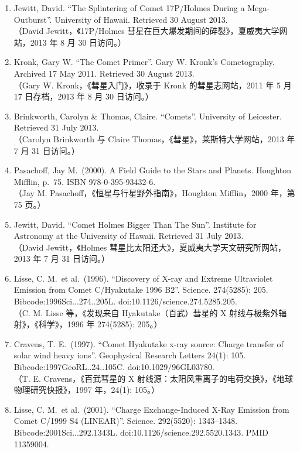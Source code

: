 \begin{enumerate}
（Rosine Lallement 等，《海尔–波普彗星在莱曼α线中的阴影》，《地球、月球与行星》，2002 年，90(1): 67–76。）
\item Jewitt, David. “The Splintering of Comet 17P/Holmes During a Mega-Outburst”. University of Hawaii. Retrieved 30 August 2013.\\
（David Jewitt，《17P/Holmes 彗星在巨大爆发期间的碎裂》，夏威夷大学网站，2013 年 8 月 30 日访问。）
\item Kronk, Gary W. “The Comet Primer”. Gary W. Kronk’s Cometography. Archived 17 May 2011. Retrieved 30 August 2013.\\
（Gary W. Kronk，《彗星入门》，收录于 Kronk 的彗星志网站，2011 年 5 月 17 日存档，2013 年 8 月 30 日访问。）
\item Brinkworth, Carolyn \& Thomas, Claire. “Comets”. University of Leicester. Retrieved 31 July 2013.\\
（Carolyn Brinkworth 与 Claire Thomas，《彗星》，莱斯特大学网站，2013 年 7 月 31 日访问。）
\item Pasachoff, Jay M.\ (2000). A Field Guide to the Stars and Planets. Houghton Mifflin, p.~75. ISBN 978-0-395-93432-6.\\
（Jay M. Pasachoff，《恒星与行星野外指南》，Houghton Mifflin，2000 年，第 75 页。）
\item Jewitt, David. “Comet Holmes Bigger Than The Sun”. Institute for Astronomy at the University of Hawaii. Retrieved 31 July 2013.\\
（David Jewitt，《Holmes 彗星比太阳还大》，夏威夷大学天文研究所网站，2013 年 7 月 31 日访问。）
\item Lisse, C. M.\ et al.\ (1996). “Discovery of X-ray and Extreme Ultraviolet Emission from Comet C/Hyakutake 1996 B2”. Science. 274(5285): 205. Bibcode:1996Sci...274..205L. doi:10.1126/science.274.5285.205.\\
（C. M. Lisse 等，《发现来自 Hyakutake（百武）彗星的 X 射线与极紫外辐射》，《科学》，1996 年 274(5285): 205。）
\item Cravens, T. E.\ (1997). “Comet Hyakutake x-ray source: Charge transfer of solar wind heavy ions”. Geophysical Research Letters 24(1): 105. Bibcode:1997GeoRL..24..105C. doi:10.1029/96GL03780.\\
（T. E. Cravens，《百武彗星的 X 射线源：太阳风重离子的电荷交换》，《地球物理研究快报》，1997 年，24(1): 105。）
\item Lisse, C. M.\ et al.\ (2001). “Charge Exchange-Induced X-Ray Emission from Comet C/1999 S4 (LINEAR)”. Science. 292(5520): 1343–1348. Bibcode:2001Sci...292.1343L. doi:10.1126/science.292.5520.1343. PMID 11359004.\\

\end{enumerate}
